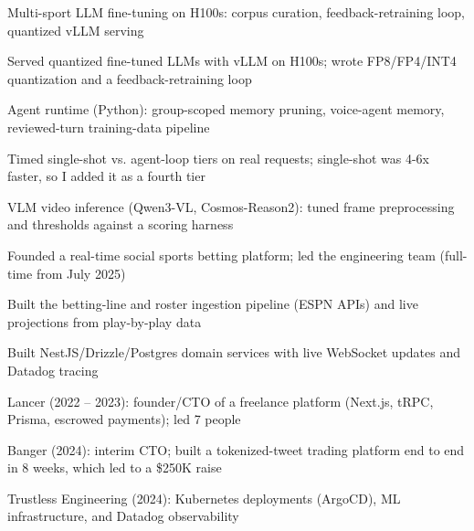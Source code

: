 \documentclass[print]{jack-resume}
\begin{document}
\begin{tightemize}
    \item Multi-sport LLM fine-tuning on H100s: corpus curation, feedback-retraining loop, quantized vLLM serving
    \item Served quantized fine-tuned LLMs with vLLM on H100s; wrote FP8/FP4/INT4 quantization and a feedback-retraining loop
    \item Agent runtime (Python): group-scoped memory pruning, voice-agent memory, reviewed-turn training-data pipeline
    \item Timed single-shot vs. agent-loop tiers on real requests; single-shot was 4-6x faster, so I added it as a fourth tier
    \item VLM video inference (Qwen3-VL, Cosmos-Reason2): tuned frame preprocessing and thresholds against a scoring harness
\end{tightemize}
\sectionsep

\begin{tightemize}
    \item Founded a real-time social sports betting platform; led the engineering team (full-time from July 2025)
    \item Built the betting-line and roster ingestion pipeline (ESPN APIs) and live projections from play-by-play data
    \item Built NestJS/Drizzle/Postgres domain services with live WebSocket updates and Datadog tracing
\end{tightemize}
\sectionsep

\begin{tightemize}
    \item Lancer (2022 -- 2023): founder/CTO of a freelance platform (Next.js, tRPC, Prisma, escrowed payments); led 7 people
    \item Banger (2024): interim CTO; built a tokenized-tweet trading platform end to end in 8 weeks, which led to a \$250K raise
    \item Trustless Engineering (2024): Kubernetes deployments (ArgoCD), ML infrastructure, and Datadog observability
\end{tightemize}
\sectionsep
\end{document}
